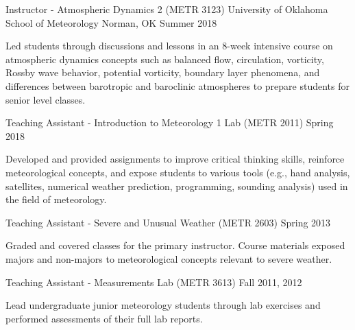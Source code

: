 
\begin{cventries}
  \cventry
    {Instructor - Atmospheric Dynamics 2 (METR 3123)} %
    {University of Oklahoma School of Meteorology} %
    {Norman, OK} %
    {Summer 2018} %
    {
      \begin{cvitems} %
        \item {Led students through discussions and lessons in an 8-week intensive course on atmospheric dynamics concepts such as balanced flow, circulation, vorticity, Rossby wave behavior, potential vorticity, boundary layer phenomena, and differences between barotropic and baroclinic atmospheres to prepare students for senior level classes.}
      \end{cvitems}
    }

  \cventry
    {Teaching Assistant - Introduction to Meteorology 1 Lab (METR 2011)} %
    {} %
    {} %
    {Spring 2018} %
    {
      \begin{cvitems} %
        \item {Developed and provided assignments to improve critical thinking skills, reinforce meteorological concepts, and expose students to various tools (e.g., hand analysis, satellites, numerical weather prediction, programming, sounding analysis) used in the field of meteorology.}
      \end{cvitems}
    }
    
  \cventry
    {Teaching Assistant - Severe and Unusual Weather (METR 2603)} %
    {} %
    {} %
    {Spring 2013} %
    {
      \begin{cvitems} %
        \item {Graded and covered classes for the primary instructor.  Course materials exposed majors and non-majors to meteorological concepts relevant to severe weather.}
      \end{cvitems}
    }
    
  \cventry
    {Teaching Assistant - Measurements Lab (METR 3613)} %
    {} %
    {} %
    {Fall 2011, 2012} %
    {
      \begin{cvitems} %
        \item {Lead undergraduate junior meteorology students through lab exercises and performed assessments of their full lab reports.  }
      \end{cvitems}
    }
    

\end{cventries}
